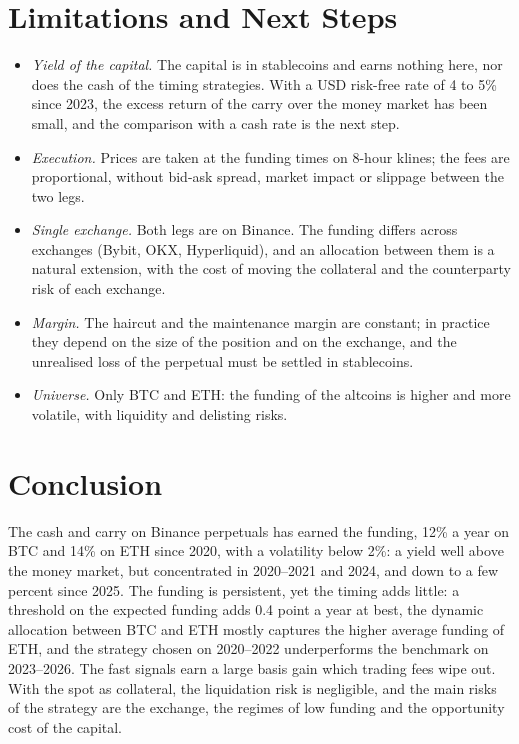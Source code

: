 \documentclass[11pt,a4paper]{article}
\begin{document}
\section{Limitations and Next Steps}\label{sec:limitations}
\begin{itemize}
\item \emph{Yield of the capital.} The capital is in stablecoins and earns nothing here, nor does the cash of the
timing strategies. With a USD risk-free rate of 4 to 5\% since 2023, the excess return of the carry over the money
market has been small, and the comparison with a cash rate is the next step.
\item \emph{Execution.} Prices are taken at the funding times on 8-hour klines; the fees are proportional, without
bid-ask spread, market impact or slippage between the two legs.
\item \emph{Single exchange.} Both legs are on Binance. The funding differs across exchanges (Bybit, OKX, Hyperliquid),
and an allocation between them is a natural extension, with the cost of moving the collateral and the counterparty
risk of each exchange.
\item \emph{Margin.} The haircut and the maintenance margin are constant; in practice they depend on the size of the
position and on the exchange, and the unrealised loss of the perpetual must be settled in stablecoins.
\item \emph{Universe.} Only BTC and ETH: the funding of the altcoins is higher and more volatile, with liquidity and
delisting risks.
\end{itemize}

\section{Conclusion}
The cash and carry on Binance perpetuals has earned the funding, 12\% a year on BTC and 14\% on ETH since 2020, with a
volatility below 2\%: a yield well above the money market, but concentrated in 2020--2021 and 2024, and down to a few
percent since 2025. The funding is persistent, yet the timing adds little: a threshold on the expected funding adds
0.4 point a year at best, the dynamic allocation between BTC and ETH mostly captures the higher average funding of
ETH, and the strategy chosen on 2020--2022 underperforms the benchmark on 2023--2026. The fast signals earn a large
basis gain which trading fees wipe out. With the spot as collateral, the liquidation risk is negligible, and the main
risks of the strategy are the exchange, the regimes of low funding and the opportunity cost of the capital.
\end{document}
